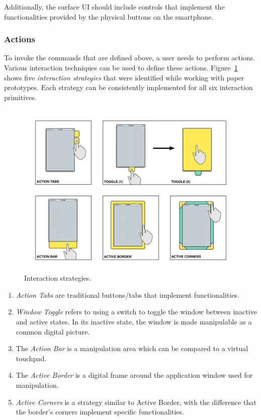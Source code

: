 Additionally, the surface UI should include controls that implement the functionalities provided by the physical buttons on the smartphone.

\subsubsection{Actions}

To invoke the commands that are defined above, a user needs to perform actions.
Various interaction techniques can be used to define these actions.
Figure~\ref{strategies} shows five \emph{interaction strategies} that were identified while working with paper prototypes.
Each strategy can be consistently implemented for all six interaction primitives.

\begin{figure}[htb]
\centering
\includegraphics[width=1\linewidth]{images/strategies}
\caption{Interaction strategies.}
\label{strategies}
\end{figure}

\begin{enumerate}
\item{\emph{Action Tabs} are traditional buttons/tabs that implement functionalities.}
\item{\emph{Window Toggle} refers to using a switch to toggle the window between inactive and active states. In its inactive state, the window is made manipulable as a common digital picture.}
\item{The \emph{Action Bar} is a manipulation area which can be compared to a virtual touchpad.}
\item{The \emph{Active Border} is a digital frame around the application window used for manipulation.}
\item{\emph{Active Corners} is a strategy similar to Active Border, with the difference that the border's corners implement specific functionalities.}
\end{enumerate}

